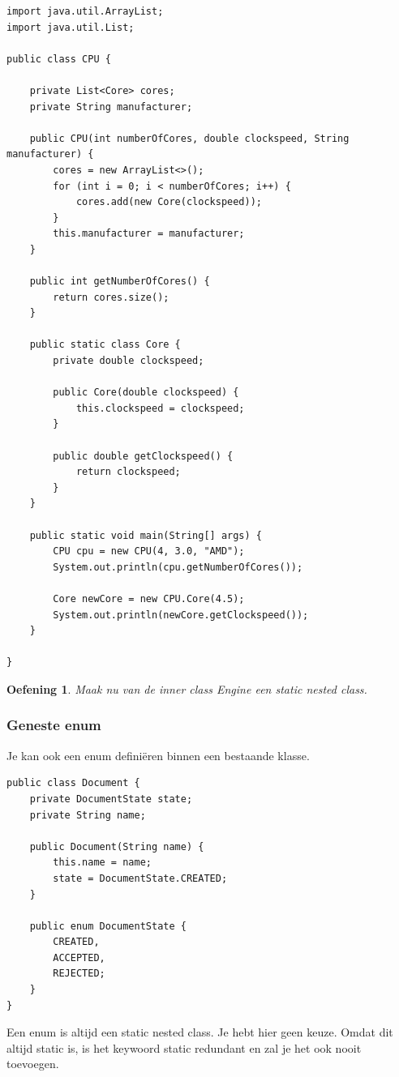 \documentclass{tstextbook}
\newtheorem{envoefening}{Oefening}[chapter]
\newenvironment{oefening}
               {\begin{boxexercise}\begin{envoefening}}
               {\end{envoefening}\end{boxexercise}}
\begin{document}
\begin{lstlisting}
import java.util.ArrayList;
import java.util.List;

public class CPU {

	private List<Core> cores;
	private String manufacturer;

	public CPU(int numberOfCores, double clockspeed, String manufacturer) {
		cores = new ArrayList<>();
		for (int i = 0; i < numberOfCores; i++) {
			cores.add(new Core(clockspeed));
		}
		this.manufacturer = manufacturer;
	}

	public int getNumberOfCores() {
		return cores.size();
	}

	public static class Core {
		private double clockspeed;

		public Core(double clockspeed) {
			this.clockspeed = clockspeed;
		}

		public double getClockspeed() {
			return clockspeed;
		}
	}

	public static void main(String[] args) {
		CPU cpu = new CPU(4, 3.0, "AMD");
		System.out.println(cpu.getNumberOfCores());

		Core newCore = new CPU.Core(4.5);
		System.out.println(newCore.getClockspeed());
	}

}
\end{lstlisting}

\begin{oefening}
Maak nu van de inner class Engine een static nested class.
\end{oefening}

\subsubsection{Geneste enum}

Je kan ook een enum defini\"eren binnen een bestaande klasse.

\begin{lstlisting}
public class Document {
	private DocumentState state;
	private String name;

	public Document(String name) {
		this.name = name;
		state = DocumentState.CREATED;
	}

	public enum DocumentState {
		CREATED,
		ACCEPTED,
		REJECTED;
	}
}
\end{lstlisting}

Een enum is altijd een static nested class. Je hebt hier geen keuze. Omdat dit altijd static is, is het keywoord static redundant en zal je het ook nooit toevoegen.
\end{document}

